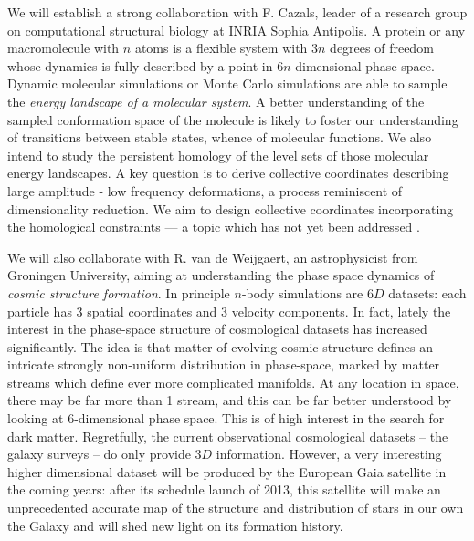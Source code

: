 
We will establish a strong collaboration with 
F. Cazals, leader of a
research group on computational structural biology at INRIA Sophia
Antipolis. A protein or any macromolecule with $n$ atoms is a flexible
system with $3n$ degrees of freedom whose dynamics is fully described
by a point in $6n$ dimensional phase space. Dynamic molecular
simulations or Monte Carlo simulations are able to sample the {\em energy
landscape of a molecular system}. A better understanding of the
sampled conformation space of the molecule is likely to
foster our understanding of transitions between stable states,
whence of molecular functions.
We also intend to study the persistent homology
of the level sets of those molecular energy landscapes. A key question
 is to derive collective coordinates describing large amplitude -
low frequency deformations, a process reminiscent of dimensionality
reduction. We aim to design collective coordinates incorporating
the homological constraints --- a topic which has not yet been
addressed \cite{djw-el-2003}. 

We will also collaborate with R. van de Weijgaert, an astrophysicist from
Groningen University, aiming at understanding the  phase space dynamics of
{\em cosmic structure formation}. In principle $n$-body simulations are
$6D$ datasets: each particle has 3 spatial coordinates and 3 velocity components.
In fact, lately the interest in the phase-space structure
of cosmological datasets has increased significantly. The idea is that matter of evolving cosmic
structure defines an intricate strongly non-uniform distribution in phase-space,
marked by matter streams which define ever more complicated
manifolds. At any location in space, there may be far more than 1 stream, and this
can be far better understood by looking at $6$-dimensional phase space. This is of high
interest in the search for dark matter. Regretfully, the current observational
cosmological datasets -- the galaxy surveys -- do only provide $3D$ information.
However, a very interesting higher dimensional dataset will be produced by
the European Gaia satellite in the coming years: after its schedule launch of 2013, this satellite
will make an unprecedented accurate map of the structure and distribution of
stars in our own the Galaxy and will shed new light on its formation
history. 

